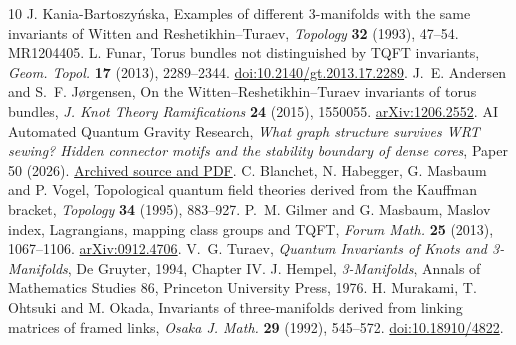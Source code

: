 \documentclass[11pt]{article}
\theoremstyle{remark}
\begin{document}
\begin{thebibliography}{10}
 J. Kania-Bartoszy\'nska, Examples of different 3-manifolds with the same invariants of Witten and Reshetikhin--Turaev, \emph{Topology} \textbf{32} (1993), 47--54. MR1204405.
 L. Funar, Torus bundles not distinguished by TQFT invariants, \emph{Geom. Topol.} \textbf{17} (2013), 2289--2344. \href{https://doi.org/10.2140/gt.2013.17.2289}{doi:10.2140/gt.2013.17.2289}.
 J.~E. Andersen and S.~F. J{\o}rgensen, On the Witten--Reshetikhin--Turaev invariants of torus bundles, \emph{J. Knot Theory Ramifications} \textbf{24} (2015), 1550055. \href{https://arxiv.org/abs/1206.2552}{arXiv:1206.2552}.
 AI Automated Quantum Gravity Research, \emph{What graph structure survives WRT sewing? Hidden connector motifs and the stability boundary of dense cores}, Paper 50 (2026). \href{https://github.com/g3173028019-beep/ai-automated-quantum-gravity-research/tree/d23f0b109029d37a09a1b8758dd73f1e27a7ef72/papers/50-wrt-graph-detection-and-stability}{Archived source and PDF}.
 C. Blanchet, N. Habegger, G. Masbaum and P. Vogel, Topological quantum field theories derived from the Kauffman bracket, \emph{Topology} \textbf{34} (1995), 883--927.
 P.~M. Gilmer and G. Masbaum, Maslov index, Lagrangians, mapping class groups and TQFT, \emph{Forum Math.} \textbf{25} (2013), 1067--1106. \href{https://arxiv.org/abs/0912.4706}{arXiv:0912.4706}.
 V.~G. Turaev, \emph{Quantum Invariants of Knots and 3-Manifolds}, De Gruyter, 1994, Chapter IV.
 J. Hempel, \emph{3-Manifolds}, Annals of Mathematics Studies 86, Princeton University Press, 1976.
 H. Murakami, T. Ohtsuki and M. Okada, Invariants of three-manifolds derived from linking matrices of framed links, \emph{Osaka J. Math.} \textbf{29} (1992), 545--572. \href{https://doi.org/10.18910/4822}{doi:10.18910/4822}.
\end{thebibliography}
\end{document}
